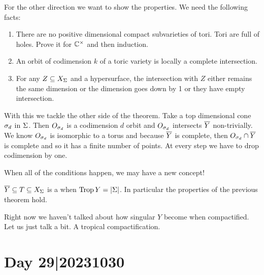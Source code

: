 \documentclass[12pt]{memoir}
\DeclareMathOperator{\Trop}{Trop}
\begin{document}
\begin{ptcbp}
For the other direction we want to show the properties. We need the following facts:
\begin{enumerate}
    \item There are no positive dimensional compact subvarieties of tori. Tori are full of holes. Prove it for $\mathbb{C}^\times$ and then induction.
    \item An orbit of codimension $k$ of a toric variety is locally a complete intersection.
    \item For any $Z\subseteq X_\Sigma$ and a hypersurface, the intersection with $Z$ either remains the same dimension or the dimension goes down by 1 or they have empty intersection.
\end{enumerate}
With this we tackle the other side of the theorem. Take a top dimensional cone $\sigma_d$ in $\Sigma$. Then $O_{\sigma_d}$ is a codimension $d$ orbit and $O_{\sigma_d}$ intersects $\overline Y$ non-trivially. We know $O_{\sigma_d}$ is isomorphic to a torus and because $\overline Y$ is complete, then $ O_{\sigma_d}\cap\overline Y$ is complete and so it has a finite number of points.  At every step we have to drop codimension by one.
\end{ptcbp}

When all of the conditions happen, we may have a new concept!

\begin{Def}
    $\overline Y\subseteq T\subseteq X_\Sigma$ is a  when $\Trop Y=|\Sg|$. In particular the properties of the previous theorem hold.
\end{Def}

Right now we haven't talked about how singular $Y$ become when compactified. Let us just talk a bit. A tropical compactification.

\section{Day 29|20231030}
\end{document}
